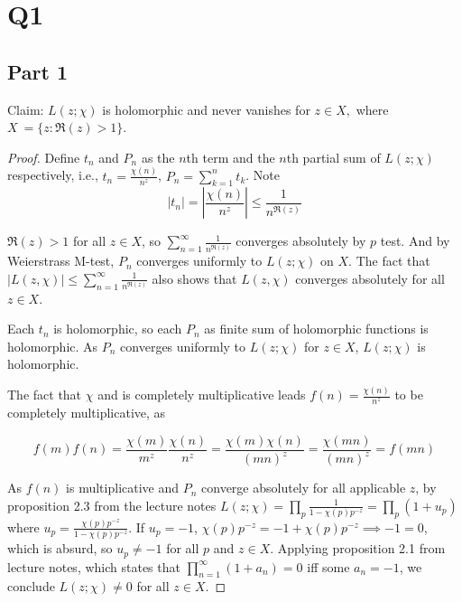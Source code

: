 \documentclass{article}
\theoremstyle{definition}
\theoremstyle{definition}
\theoremstyle{remark}
\begin{document}
\section{Q1}

\subsection{Part 1} 
Claim: $L(z; \chi)$ is holomorphic and never vanishes for $z \in X, $ where $X \:= \{z: \Re(z) > 1 \}$.

\begin{proof}
	Define $t_n$ and $P_n$ as the $n$th term and the $n$th partial sum of $L(z; \chi)$ respectively, i.e., $t_n = \frac{\chi(n)}{n^z}$, $P_n = \sum_{k=1}^{n} t_k$.
	Note
	$$
	|t_n| = \left|\frac{\chi(n)}{n^z} \right| \leq \frac{1}{n^{\Re(z)}}
	$$

	$\Re(z) > 1$ for all $z \in X$, so $\sum_{n=1}^{\infty} \frac{1}{n^{\Re(z)}}$ converges absolutely by $p$ test. 
And by Weierstrass M-test, $P_n$ converges uniformly to $L(z; \chi)$ on $X$.
The fact that $|L(z, \chi)| \leq \sum_{n=1}^{\infty} \frac{1}{n^{\Re(z)}}$ also shows that $L(z, \chi)$ converges absolutely for all $z \in X$.

Each $t_n$ is holomorphic, so each $P_n$ as finite sum of holomorphic functions is holomorphic. 
As $P_n$ converges uniformly to $L(z; \chi)$ for $z \in X$, $L(z; \chi)$ is holomorphic.

The fact that $\chi$ and is completely multiplicative leads $f(n) = \frac{\chi(n)}{n^z}$ to be completely multiplicative, as 

\begin{equation}\label{eq:completely_multiplicative}
	f(m)f(n) = \frac{\chi(m)}{m^z} \frac{\chi(n)}{n^z} = \frac{\chi(m)\chi(n)}{(mn)^z} = \frac{\chi(mn)}{(mn)^z} = f(mn)
\end{equation}

As $f(n)$ is multiplicative and $P_n$ converge absolutely for all applicable $z$, by proposition 2.3 from the lecture notes $L(z; \chi) = \prod_{p} \frac{1}{1- \chi(p)p^{-z}} = \prod_p (1 + u_p)$ where $u_p = \frac{\chi(p)p^{-z}}{1 - \chi(p) p ^{-z}}$. 
If $u_p = -1$, $\chi(p) p ^{-z} = -1 +  \chi(p) p ^{-z} \implies -1 = 0$, which is absurd, so $u_p \neq -1 $ for all $p$ and $z \in X$. 
Applying proposition 2.1 from lecture notes, which states that $\prod_{n=1}^{\infty} (1+a_n) = 0$ iff some $a_n = -1$, we conclude $L(z; \chi) \neq 0 $ for all $z \in X.$
\end{proof}
\end{document}
